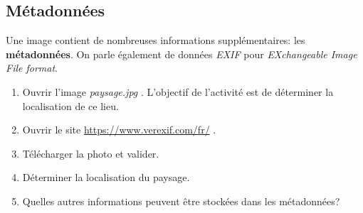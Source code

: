 \documentclass[a4paper,11pt]{article}
\begin{document}
\begin{Form}
\section{Métadonnées}
Une image contient de nombreuses informations supplémentaires: les \textbf{métadonnées}. On parle également de données \emph{EXIF} pour \emph{EXchangeable Image File format}.
\begin{activite}
\begin{enumerate}
\item Ouvrir l'image \emph{paysage.jpg} . L'objectif de l'activité est de déterminer la localisation de ce lieu.
\item Ouvrir le site \url{https://www.verexif.com/fr/} .
\item Télécharger la photo et valider.
\item Déterminer la localisation du paysage.
\item Quelles autres informations peuvent être stockées dans les métadonnées?
\end{enumerate}
\end{activite}
\end{Form}
\end{document}
